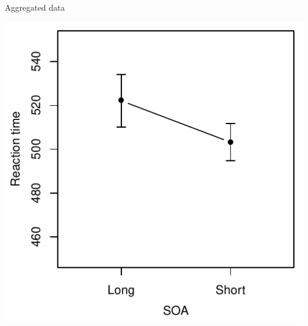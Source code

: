\documentclass[aspectratio=169]{beamer}
\begin{document}
\begin{frame}{Aggregated data}
  \begin{center}
    \includegraphics[scale=.8]{fig/baayen_ex_agg}
  \end{center}
\end{frame}
\end{document}
